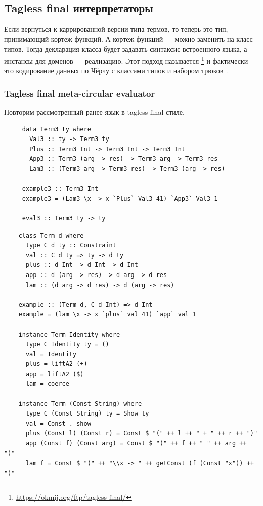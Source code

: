 

\subsection{Tagless final интерпретаторы}

Если вернуться к каррированной версии типа термов, то теперь это тип, принимающий кортеж функций.
А кортеж функций --- можно заменить на класс типов.
Тогда декларация класса будет задавать синтаксис встроенного языка, а инстансы для доменов --- реализацию.
Этот подход называется \footnote{\url{https://okmij.org/ftp/tagless-final/}} и фактически это кодирование данных по Чёрчу с классами типов и набором трюков~\cite{carette2007finally, kiselyov2012typed}.

\subsubsection{Tagless final meta-circular evaluator}

Повторим рассмотренный ранее язык в tagless final стиле.

\begin{verbatim}
     data Term3 ty where
       Val3 :: ty -> Term3 ty
       Plus :: Term3 Int -> Term3 Int -> Term3 Int
       App3 :: Term3 (arg -> res) -> Term3 arg -> Term3 res
       Lam3 :: (Term3 arg -> Term3 res) -> Term3 (arg -> res)

     example3 :: Term3 Int
     example3 = (Lam3 \x -> x `Plus` Val3 41) `App3` Val3 1

     eval3 :: Term3 ty -> ty
\end{verbatim}

\begin{verbatim}
    class Term d where
      type C d ty :: Constraint
      val :: C d ty => ty -> d ty
      plus :: d Int -> d Int -> d Int
      app :: d (arg -> res) -> d arg -> d res
      lam :: (d arg -> d res) -> d (arg -> res)

    example :: (Term d, C d Int) => d Int
    example = (lam \x -> x `plus` val 41) `app` val 1

    instance Term Identity where
      type C Identity ty = ()
      val = Identity
      plus = liftA2 (+)
      app = liftA2 ($)
      lam = coerce

    instance Term (Const String) where
      type C (Const String) ty = Show ty
      val = Const . show
      plus (Const l) (Const r) = Const $ "(" ++ l ++ " + " ++ r ++ ")"
      app (Const f) (Const arg) = Const $ "(" ++ f ++ " " ++ arg ++ ")"
      lam f = Const $ "(" ++ "\\x -> " ++ getConst (f (Const "x")) ++ ")"
\end{verbatim}

